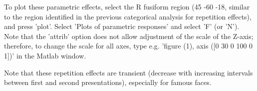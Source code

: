 To plot these parametric effects, select the R fusiform region (45 -60 -18, similar to the region identified in the previous categorical analysis for repetition effects), and press 'plot'. Select 'Plots of parametric responses' and select 'F' (or 'N').  Note that the 'attrib' option does not allow adjustment of the scale of the Z-axis; therefore, to change the scale for all axes, type e.g. 'figure (1), axis ([0 30 0 100 0 1])' in the Matlab window.

Note that these repetition effects are transient (decrease with increasing intervals between first and second presentations), especially for famous faces.

